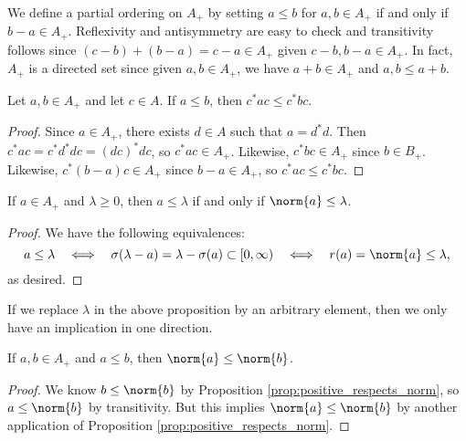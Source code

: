 \begin{definition}
We define a partial ordering on $A_+$ by setting $a \leq b$ for $a, b \in A_+$ if and only if $b - a \in A_+$. Reflexivity and antisymmetry are easy to check and transitivity follows since $(c - b) + (b - a) = c - a \in A_+$ given $c - b, b - a \in A_+$. In fact, $A_+$ is a directed set since given $a, b \in A_+$, we have $a+b \in A_+$ and $a, b \leq a + b$. 
\end{definition}

\begin{proposition}\label{prop:inner_aut_preserves_order}
Let $a, b \in A_+$ and let $c \in A$. If $a \leq b$, then $c^*ac \leq c^* bc$.
\end{proposition}

\begin{proof}
Since $a \in A_+$, there exists $d \in A$ such that $a = d^*d$. Then $c^*ac = c^*d^*dc = (dc)^*dc$, so $c^*ac \in A_+$. Likewise, $c^*bc \in A_+$ since $b \in B_+$. Likewise, $c^*(b - a)c \in A_+$ since $b -a \in A_+$, so $c^*ac \leq c^*bc$. 
\end{proof}

\begin{proposition}\label{prop:positive_respects_norm}
If $a \in A_+$ and $\lambda \geq 0$, then $a \leq \lambda$ if and only if $\norm{a} \leq \lambda$.
\end{proposition}

\begin{proof}
We have the following equivalences:
\begin{equation}
a \leq \lambda \quad \Longleftrightarrow \quad \sigma(\lambda - a) = \lambda - \sigma(a) \subset [0, \infty) \quad \Longleftrightarrow \quad r(a) = \norm{a} \leq \lambda,
\end{equation}
as desired.
\end{proof}

If we replace $\lambda$ in the above proposition by an arbitrary element, then we only have an implication in one direction.

\begin{proposition}
If $a, b \in A_+$ and $a \leq b$, then $\norm{a} \leq \norm{b}$.
\end{proposition}

\begin{proof}
We know $b \leq \norm{b}$ by Proposition \ref{prop:positive_respects_norm}, so $a \leq \norm{b}$ by transitivity. But this implies $\norm{a} \leq \norm{b}$ by another application of Proposition \ref{prop:positive_respects_norm}.
\end{proof}

